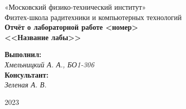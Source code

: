 \pagecolor{Cornsilk1}


\pagestyle{fancy}
\fancyhead{}
\fancyfoot[C]{\color{mycolor} \textit{\leftmark}}
\renewcommand{\headrulewidth}{0pt}
\fancypagestyle{plain}{
  \renewcommand{\headrulewidth}{0pt}
}


\thispagestyle{empty}

\begin{center}
\large{«Московский физико-технический институт»} \\  
\large{Физтех-школа радитехники и компьютерных технологий }\\
\vspace*{6cm}
{\bfseries
    {\Huge Отчёт о лабораторной работе \textnumero <номер>  \\ <<Название лабы>>}
}
\end{center}

\vspace*{1cm}
\begin{flushright}
    \large{
    \textbf{Выполнил:} \\ \textit{ Хмельницкий А. А., БО1-306} \\
    \textbf{Консультант:} \\ \textit{Зеленая А. В.}
    }
\end{flushright}

\vspace*{11cm}
\begin{center}
2023
\end{center}

\newpage